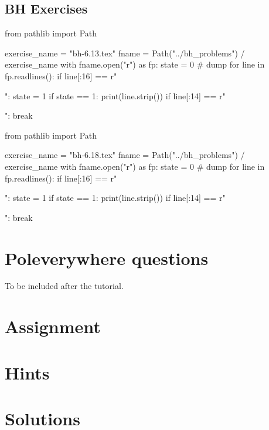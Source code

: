 \subsection{BH Exercises}
\label{sec:bh-exercises-1}


\begin{pycode}
from pathlib import Path

exercise_name = "bh-6.13.tex"
fname = Path("../bh_problems") / exercise_name
with fname.open("r") as fp:
    state = 0  # dump
    for line in fp.readlines():
        if line[:16] == r"\begin{exercise}":
            state = 1
        if state == 1:
            print(line.strip())
        if line[:14] == r"\end{exercise}":
            break
\end{pycode}

\begin{pycode}
from pathlib import Path

exercise_name = "bh-6.18.tex"
fname = Path("../bh_problems") / exercise_name
with fname.open("r") as fp:
    state = 0  # dump
    for line in fp.readlines():
        if line[:16] == r"\begin{exercise}":
            state = 1
        if state == 1:
            print(line.strip())
        if line[:14] == r"\end{exercise}":
            break
\end{pycode}

\section{Poleverywhere questions}
\label{sec:polev-quest}

To be included after the tutorial.

\section{Assignment}
\label{sec:assignment}

\setcounter{theorem}{0}







\clearpage
\section{Hints}

\clearpage
\section{Solutions}



